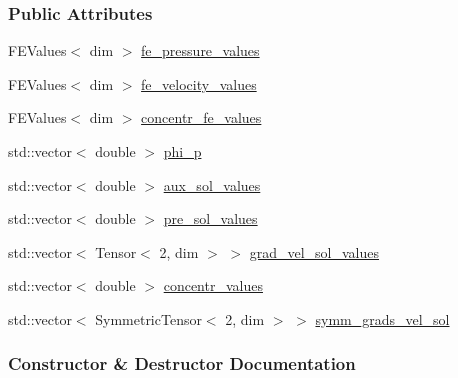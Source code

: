\subsubsection*{Public Attributes}
\begin{DoxyCompactItemize}
\item 
F\+E\+Values$<$ dim $>$ \hyperlink{struct_assembly_1_1_scratch_1_1pressure__rot__step_ac41f7bf5aa82b80e01ba8453c31e5fdd}{fe\+\_\+pressure\+\_\+values}
\item 
F\+E\+Values$<$ dim $>$ \hyperlink{struct_assembly_1_1_scratch_1_1pressure__rot__step_af0e05e66de3967bf2736defbcee157d5}{fe\+\_\+velocity\+\_\+values}
\item 
F\+E\+Values$<$ dim $>$ \hyperlink{struct_assembly_1_1_scratch_1_1pressure__rot__step_a897061bf69830b1212f797ff3af9d250}{concentr\+\_\+fe\+\_\+values}
\item 
std\+::vector$<$ double $>$ \hyperlink{struct_assembly_1_1_scratch_1_1pressure__rot__step_aeaca955234a85e889b5c71e912240025}{phi\+\_\+p}
\item 
std\+::vector$<$ double $>$ \hyperlink{struct_assembly_1_1_scratch_1_1pressure__rot__step_abd85718af16840d6abc3a01abe1fb6e3}{aux\+\_\+sol\+\_\+values}
\item 
std\+::vector$<$ double $>$ \hyperlink{struct_assembly_1_1_scratch_1_1pressure__rot__step_a9de7969f5b98cb8dfc629301647b5c3e}{pre\+\_\+sol\+\_\+values}
\item 
std\+::vector$<$ Tensor$<$ 2, dim $>$ $>$ \hyperlink{struct_assembly_1_1_scratch_1_1pressure__rot__step_a8530984bbf6ea328b90cf347b748bdc6}{grad\+\_\+vel\+\_\+sol\+\_\+values}
\item 
std\+::vector$<$ double $>$ \hyperlink{struct_assembly_1_1_scratch_1_1pressure__rot__step_a80d0030ad6c786b9d1e7e5365497ac41}{concentr\+\_\+values}
\item 
std\+::vector$<$ Symmetric\+Tensor$<$ 2, dim $>$ $>$ \hyperlink{struct_assembly_1_1_scratch_1_1pressure__rot__step_a1bfe900ee774329a556f620ae765573b}{symm\+\_\+grads\+\_\+vel\+\_\+sol}
\end{DoxyCompactItemize}


\subsubsection{Constructor \& Destructor Documentation}
\hypertarget{struct_assembly_1_1_scratch_1_1pressure__rot__step_a9a782a85d4cfb0b5f50a0fcd76924d23}{}
